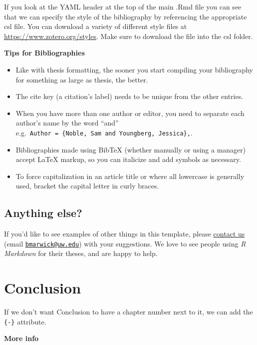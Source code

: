 \documentclass[print]{nuthesis}
\providecommand{\tightlist}{%
  \setlength{\itemsep}{0pt}\setlength{\parskip}{0pt}}
\begin{document}
If you look at the YAML header at the top of the main .Rmd file you can see that we can specify the style of the bibliography by referencing the appropriate csl file. You can download a variety of different style files at \url{https://www.zotero.org/styles}. Make sure to download the file into the csl folder.

\textbf{Tips for Bibliographies}

\begin{itemize}
\tightlist
\item
  Like with thesis formatting, the sooner you start compiling your bibliography for something as large as thesis, the better.
\item
  The cite key (a citation's label) needs to be unique from the other entries.
\item
  When you have more than one author or editor, you need to separate each author's name by the word ``and'' e.g.~\texttt{Author\ =\ \{Noble,\ Sam\ and\ Youngberg,\ Jessica\},}.
\item
  Bibliographies made using BibTeX (whether manually or using a manager) accept LaTeX markup, so you can italicize and add symbols as necessary.
\item
  To force capitalization in an article title or where all lowercase is generally used, bracket the capital letter in curly braces.
\end{itemize}

\hypertarget{anything-else}{%
\section{Anything else?}\label{anything-else}}

If you'd like to see examples of other things in this template, please \href{https://github.com/benmarwick/huskydown/issues/new}{contact us} (email \href{mailto:bmarwick@uw.edu}{\nolinkurl{bmarwick@uw.edu}}) with your suggestions. We love to see people using \emph{R Markdown} for their theses, and are happy to help.

\hypertarget{conclusion-1}{%
\chapter*{Conclusion}\label{conclusion-1}}

If we don't want Conclusion to have a chapter number next to it, we can add the \texttt{\{-\}} attribute.

\textbf{More info}
\end{document}
